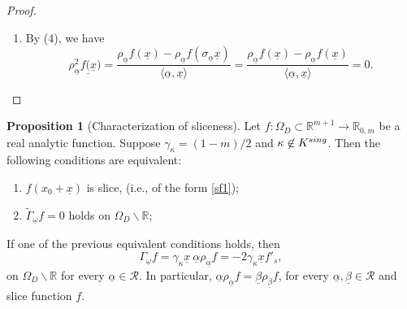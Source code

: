 \documentclass{amsart}
\theoremstyle{definition}
\newtheorem{proposition}[theorem]{Proposition}
\theoremstyle{remark}
\numberwithin{equation}{section}
\begin{document}
\begin{proof}
\begin{enumerate}
        Since $\sigma_{\underline{\alpha}}^2=\operatorname{Id}$, for any $\underline{x}$ we have
        \begin{equation*}
            \rho_{\underline\alpha} (f\circ\sigma_{\underline{\alpha}})(\underline x)=\dfrac{f(\sigma_{\underline{\alpha}} \underline x)-f(\sigma_{\underline{\alpha}}^2 \underline x)}{\langle \underline{\alpha}, \underline x\rangle}=\dfrac{f(\sigma_{\underline{\alpha}}\underline x)-f(\underline x)}{\langle \underline{\alpha}, \underline x\rangle}=-\rho_{\underline\alpha} f(\underline x).
        \end{equation*}
        \item By (4), we have
        \begin{equation*}
            \rho_{\underline\alpha}^2 f\underline (\underline x)=\dfrac{\rho_{\underline\alpha} f(\underline x)-\rho_{\underline\alpha} f(\sigma_{\underline{\alpha}}\underline x)}{\langle \underline{\alpha}, \underline x\rangle}=\dfrac{\rho_{\underline\alpha} f(\underline x)-\rho_{\underline\alpha} f(\underline x)}{\langle \underline{\alpha},\underline x\rangle}=0.
        \end{equation*}
    \end{enumerate}
\end{proof}

\begin{proposition}[Characterization of sliceness]
\label{prop charcaterization sliceness}
    Let $f: \Omega_{D}\subset \mathbb{R}^{m+1}\to\mathbb{R}_{0, m}$ be a real analytic function. Suppose $\gamma_{\kappa}=(1-m)/2$ and $\kappa \not\in K^{{\rm sing}}$. Then the following conditions are equivalent:
    \begin{enumerate}
        \item  $f(x_{0}+\underline{x})$ is slice, (i.e., of the form \eqref{sf1});
        \item  $\displaystyle \widetilde{\Gamma}_{\underline\omega}f=0$ holds on $\Omega_{D}\backslash\mathbb{R}$;
    \end{enumerate}
    If one of the previous equivalent conditions holds, %
    then
    \begin{equation*}
        \Gamma_{\underline\omega}f= \gamma_{\kappa}\underline x\ \underline\alpha \rho_{\underline\alpha}f=-2 \gamma_{\kappa}\underline xf'_s,
    \end{equation*}
on $\Omega_{D}\backslash\mathbb{R}$ for every $\underline{\alpha}\in \mathscr{R}$. In particular,  $\underline{\alpha} \rho_{\underline{\alpha}}f=\underline{\beta} \rho_{\underline{\beta}}f$, for every $\underline{\alpha}, \underline{\beta}\in \mathscr{R}$ and slice function $f$.
\end{proposition}
\end{document}
